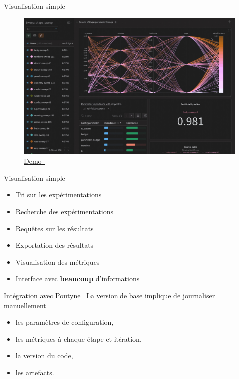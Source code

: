 \documentclass[aspectratio=169,10pt,xcolor=x11names,english,french]{beamer}
\newcommand{\link}[2]{\href{#1}{#2~{\smaller\faExternalLink*}}}
\newcommand{\guillemet}[1]{\guillemotleft #1 \guillemotright}
\begin{document}
	\begin{frame}{Visualisation simple}
		\centering
		\begin{figure}
			\includegraphics[width=\linewidth,keepaspectratio, height=0.7\textheight]{img/6066c22135b89828fead7950_visualize-seamlessly-weights-biases.jpg}
			\caption{\link{https://wandb.ai/site}{Demo}}
		\end{figure}
	\end{frame}
	
	\begin{frame}{Visualisation simple}
		\begin{itemize}
			\item Tri sur les expérimentations
			\item Recherche des expérimentations
			\item Requêtes sur les résultats
			\item Exportation des résultats
			\item Visualisation des métriques
			\item Interface avec \textbf{beaucoup} d'informations
		\end{itemize}
	\end{frame}
	
	
	\begin{frame}{Intégration avec \link{https://poutyne.org/}{Poutyne}}
		La version de \guillemet{base} implique de journaliser manuellement 
		\begin{itemize}
			\item les paramètres de configuration,
			\item les métriques à chaque étape et itération,
			\item la version du code,
			\item les artefacts.
		\end{itemize}
	\end{frame}
	
\end{document}
